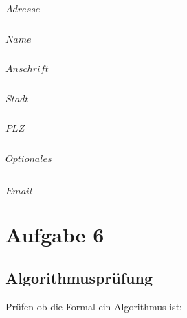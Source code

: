 \documentclass[11pt]{article} %
\begin{document}
$Adresse$\\
\begin{Syntaxdiagramm}%
\end{Syntaxdiagramm}
\\
$Name$\\
\begin{Syntaxdiagramm}%
\end{Syntaxdiagramm}
\\
$Anschrift$\\
\begin{Syntaxdiagramm}%
	\Alternative
		{
		}
		{
		}
\end{Syntaxdiagramm}
\\
$Stadt$\\
\begin{Syntaxdiagramm}%
\end{Syntaxdiagramm}
\\
$PLZ$\\
\begin{Syntaxdiagramm}%
\end{Syntaxdiagramm}
\\
$Optionales$\\
\begin{Syntaxdiagramm}%
	\Alternative
	{}
	{\PfeilR}
	\Alternative
	{}
	{\PfeilR}
	\Alternative
	{}
	{\PfeilR}
\end{Syntaxdiagramm}
\\
$Email$\\
\begin{Syntaxdiagramm}%
\end{Syntaxdiagramm}

\newpage

\section{Aufgabe 6}

\subsection{Algorithmusprüfung}
Prüfen ob die Formal ein Algorithmus ist:
\end{document}
